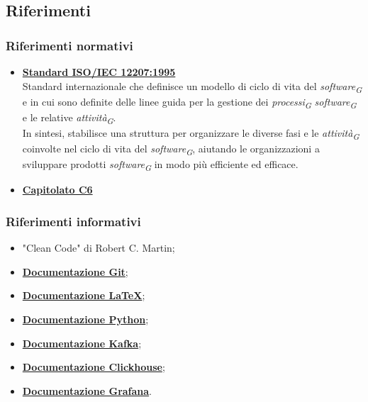 \subsection{Riferimenti}
\subsubsection{Riferimenti normativi}
\begin{itemize}
    \item \href{https://www.math.unipd.it/~tullio/IS-1/2009/Approfondimenti/ISO_12207-1995.pdf}{\textbf{Standard ISO/IEC 12207:1995}} \\
    Standard internazionale che definisce un modello di ciclo di vita del \textit{software}\textsubscript{\textit{G}} e in cui sono definite delle linee guida per la gestione dei \textit{processi}\textsubscript{\textit{G}} \textit{software}\textsubscript{\textit{G}} e le relative \textit{attività}\textsubscript{\textit{G}}.\\
    In sintesi, stabilisce una struttura per organizzare le diverse fasi e le \textit{attività}\textsubscript{\textit{G}} coinvolte nel ciclo di vita del \textit{software}\textsubscript{\textit{G}}, aiutando le organizzazioni a sviluppare prodotti \textit{software}\textsubscript{\textit{G}} in modo più efficiente ed efficace.

    \item \href{https://www.math.unipd.it/~tullio/IS-1/2023/Progetto/C6.pdf}{\textbf{Capitolato C6}}

\end{itemize}
\subsubsection{Riferimenti informativi}
\begin{itemize}
    \item "Clean Code" di Robert C. Martin;
    \item \href{https://git-scm.com/docs}{\textbf{Documentazione Git}};
    \item \href{https://www.latex-project.org/help/documentation/}{\textbf{Documentazione \LaTeX}};
    \item \href{https://docs.python.org/3/}{\textbf{Documentazione Python}};
    \item \href{https://kafka.apache.org/documentation/}{\textbf{Documentazione Kafka}};
    \item \href{https://clickhouse.com/docs}{\textbf{Documentazione Clickhouse}};
    \item \href{https://grafana.com/docs/grafana/latest/}{\textbf{Documentazione Grafana}}.
\end{itemize}
